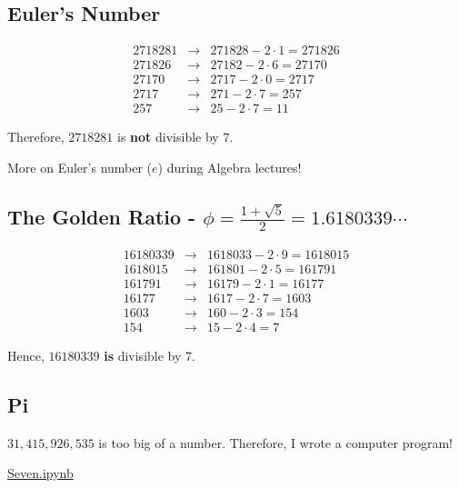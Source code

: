 \clearpage

\subsection*{Euler's Number}

\begin{eqnarray*}  
	2718281 &\to& 271828-2\cdot 1=271826 \\ 
	271826 &\to& 27182-2\cdot 6=27170 \\
	27170 &\to& 2717-2\cdot 0=2717 \\ 2717 &\to& 271-2\cdot 7=257 \\ 257 &\to& 25-2\cdot 7=11
\end{eqnarray*}

Therefore, $2718281$ is \textbf{not} divisible by $7$.

More on Euler's number ($e$) during Algebra lectures!  

\clearpage

\subsection*{The Golden Ratio - $\phi=\frac{1+\sqrt{5}}{2}=1.6180339\cdots$}

\begin{eqnarray*}
	16180339 &\to& 1618033-2\cdot 9=1618015 \\ 1618015 &\to& 161801-2\cdot 5=161791 \\ 161791 &\to& 16179-2\cdot 1=16177 \\ 16177 &\to& 1617-2\cdot 7=1603 \\ 1603 &\to& 160-2\cdot 3=154 \\ 154 &\to& 15-2\cdot 4=7
\end{eqnarray*}  

Hence, $16180339$ \textbf{is} divisible by $7$.

\clearpage

\subsection*{Pi}

$31,415,926,535$ is too big of a number.  Therefore, I wrote a computer program!

\begin{center} \Huge \href{https://github.com/musichead42/Teaching/blob/master/astar2016wmc/programs/Seven.ipynb}{Seven.ipynb} \end{center}
\normalsize


